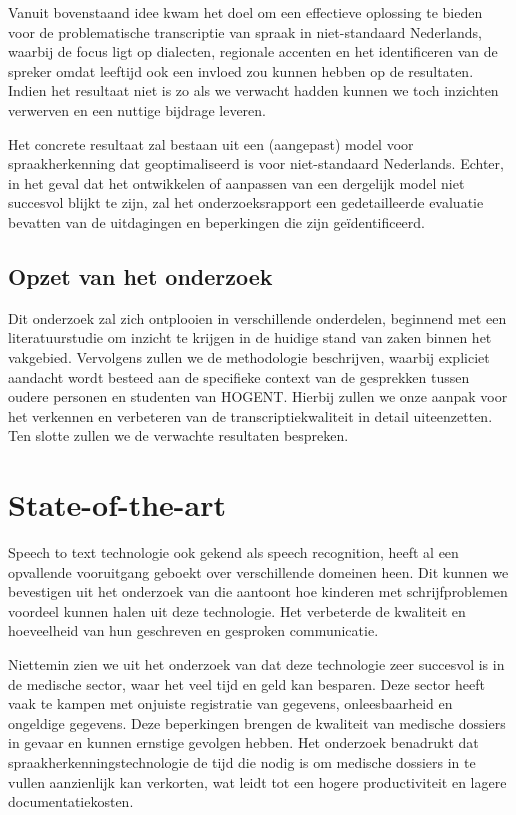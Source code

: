 Vanuit bovenstaand idee kwam het doel om een effectieve oplossing te bieden voor de problematische transcriptie van spraak in niet-standaard Nederlands, waarbij de focus ligt op dialecten, regionale accenten en het identificeren van de spreker omdat leeftijd ook een invloed zou kunnen hebben op de resultaten. Indien het resultaat niet is zo als we verwacht hadden kunnen we toch inzichten verwerven en een nuttige bijdrage leveren.

Het concrete resultaat zal bestaan uit een (aangepast) model voor spraakherkenning dat geoptimaliseerd is voor niet-standaard Nederlands. Echter, in het geval dat het ontwikkelen of aanpassen van een dergelijk model niet succesvol blijkt te zijn, zal het onderzoeksrapport een gedetailleerde evaluatie bevatten van de uitdagingen en beperkingen die zijn geïdentificeerd.

\subsection{Opzet van het onderzoek}
Dit onderzoek zal zich ontplooien in verschillende onderdelen, beginnend met een literatuurstudie om inzicht te krijgen in de huidige stand van zaken binnen het vakgebied.   Vervolgens zullen we de methodologie beschrijven, waarbij expliciet aandacht wordt besteed aan de specifieke context van de gesprekken tussen oudere personen en studenten van HOGENT. Hierbij zullen we onze aanpak voor het verkennen en verbeteren van de transcriptiekwaliteit in detail uiteenzetten. Ten slotte zullen we de verwachte resultaten bespreken.




\section{State-of-the-art}%
\label{sec:state-of-the-art}
Speech to text technologie ook gekend als speech recognition, heeft al een opvallende vooruitgang geboekt over verschillende domeinen heen. Dit kunnen we bevestigen uit het onderzoek van \autocite{Kambouri2023} die aantoont hoe kinderen met schrijfproblemen voordeel kunnen halen uit deze technologie. Het verbeterde de kwaliteit en hoeveelheid van hun geschreven en gesproken communicatie.

Niettemin zien we uit het onderzoek van \autocite{ajami2016use} dat deze technologie zeer succesvol is in de medische sector, waar het veel tijd en geld kan besparen. Deze sector heeft vaak te kampen met onjuiste registratie van gegevens, onleesbaarheid en ongeldige gegevens. Deze beperkingen brengen de kwaliteit van medische dossiers in gevaar en kunnen ernstige gevolgen hebben. Het onderzoek benadrukt dat spraakherkenningstechnologie de tijd die nodig is om medische dossiers in te vullen aanzienlijk kan verkorten, wat leidt tot een hogere productiviteit en lagere documentatiekosten.

